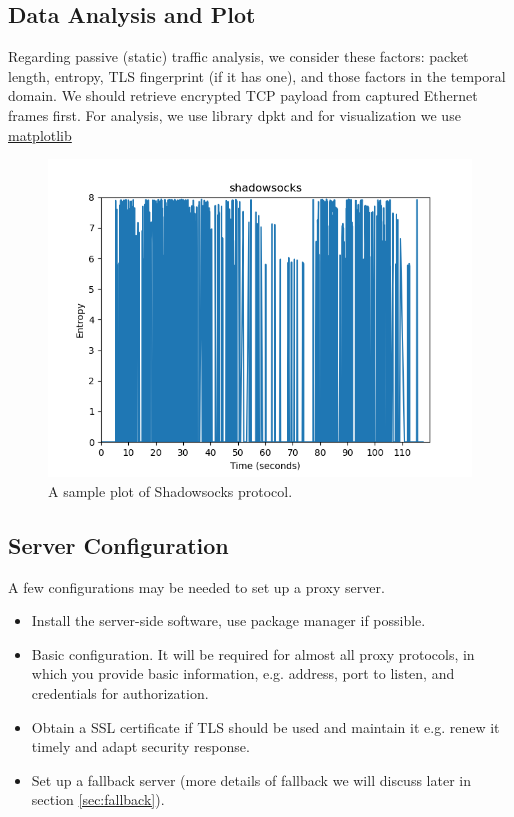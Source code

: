 \subsection{Data Analysis and Plot}
\begin{frame}

\small
Regarding passive (static) traffic analysis, we consider these factors: packet length, entropy, TLS fingerprint (if it has one), and those factors in the temporal domain.
We should retrieve encrypted TCP payload from captured Ethernet frames first. 
For analysis, we use library dpkt \cite{dpkt} and for visualization we use \href{https://matplotlib.org/}{matplotlib}

\begin{figure}
    \centering
    \includegraphics[scale=0.35]{pics/plot.png}
    \caption{\tiny A sample plot of Shadowsocks protocol.}
    \label{fig:enter-label}
\end{figure}
    
\end{frame}

\subsection{Server Configuration}
\begin{frame}

    A few configurations may be needed to set up a proxy server.

    \begin{itemize}
    \item Install the server-side software, use package manager if possible.
    \item Basic configuration. It will be required for almost all proxy protocols, in which you provide basic information, e.g. address, port to listen, and credentials for authorization.  
    \item Obtain a SSL certificate if TLS should be used and maintain it e.g. renew it timely and adapt security response.
    \item Set up a fallback server (more details of fallback we will discuss later in section \ref{sec:fallback}).
    \end{itemize}
\end{frame}

